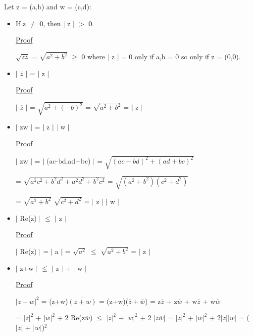 	\qquad Let z = (a,b) and w = (c,d):
	\begin{itemize}[leftmargin=2cm]
		\item If z $\neq$ 0, then $|$ z $|$ $>$ 0.

			{ \color{magenta} \underline{Proof} } 
			
				$\sqrt{z\overline{z}}$ = $\sqrt{a^2 + b^2}$ $\geq$ 0
				where $|$ z $|$ = 0 only if a,b = 0 so only if z = (0,0).

		\item $|$ $\overline{z}$ $|$ = $|$ z  $|$

			{ \color{magenta} \underline{Proof} } 
			
				$|$ $\overline{z}$ $|$ = $\sqrt{a^2 + (-b)^2}$ = $\sqrt{a^2 + b^2}$ = $|$ z $|$

		\item $|$ zw $|$ = $|$ z $|$ $|$ w $|$

			{ \color{magenta} \underline{Proof} } 
			
				$|$ zw $|$ = $|$ (ac-bd,ad+bc) $|$ = $\sqrt{(ac-bd)^2 + (ad+bc)^2}$
			
				= $\sqrt{a^2c^2 + b^2d^2 + a^2d^2 + b^2c^2}$
				= $\sqrt{(a^2+b^2)(c^2+d^2)}$

				= $\sqrt{a^2+b^2}$ $\sqrt{c^2+d^2}$ = $|$ z $|$ $|$ w $|$

		\item $|$ Re(z) $|$ $\leq$ $|$ z $|$

			{ \color{magenta} \underline{Proof} } 
			
				$|$ Re(z) $|$ = $|$ a $|$ = $\sqrt{a^2}$ $\leq$ $\sqrt{a^2+b^2}$ = $|$ z $|$

		\item $|$ z+w $|$ $ \leq $  $|$ z $|$ + $|$ w $|$

			{ \color{magenta} \underline{Proof} } 
			
				$| z+w |^2$ = (z+w)$\overline{(z+w)}$ = (z+w)($\overline{z} + \overline{w}$)
				= z$\overline{z}$ + z$\overline{w}$ + w$\overline{z}$ + w$\overline{w}$
			
				= $|z|^2$ + $|w|^2$ + 2 Re(z$\overline{w}$)
				$\leq$ $|z|^2$ + $|w|^2$ + 2 $|z\overline{w}|$
				= $|z|^2$ + $|w|^2$ + 2$|z||w|$
				= ($|z|$ + $|w|$)$^2$
	\end{itemize}


